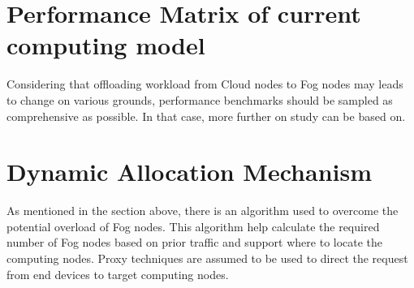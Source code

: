 \section{Performance Matrix of current computing model}
Considering that offloading workload from Cloud nodes to Fog nodes may leads to change on various grounds, performance benchmarks should be sampled as comprehensive as possible. In that case, more further on study can be based on.

\section{Dynamic Allocation Mechanism}
As mentioned in the section above, there is an algorithm used to overcome the potential overload of Fog nodes. This algorithm help calculate the required number of Fog nodes based on prior traffic and support where to locate the computing nodes. Proxy techniques are assumed to be used to direct the request from end devices to target computing nodes.